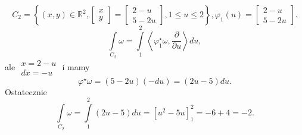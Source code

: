 \documentclass[../main.tex]{subfiles}
\begin{document}
\begin{przyklad}
    \[
        C_2 = \left\{ (x,y)\in \mathbb{R}^2, \begin{bmatrix} x\\y \end{bmatrix} = \begin{bmatrix} 2-u\\5-2u \end{bmatrix}, 1\le u \le 2 \right\}, \varphi_1(u) = \begin{bmatrix} 2-u\\5-2u \end{bmatrix}
    .\]
\[
\int\limits_{C_2}\omega = \int\limits_1^2 \left<\varphi_1^\star \omega, \frac{\partial }{\partial u}  \right>du
,\]
ale $\begin{matrix}x = 2-u\\ dx = -u\end{matrix}$ i mamy
     \[
         \varphi^\star \omega = (5-2u)(-du) = (2u-5)du
    .\]
Ostatecznie
\[
    \int\limits_{C_2}\omega = \int\limits_1^2(2u-5)du = \left[ u^2 - 5u \right] _1^2 = -6+4 = -2
.\]
\end{przyklad}
\end{document}
